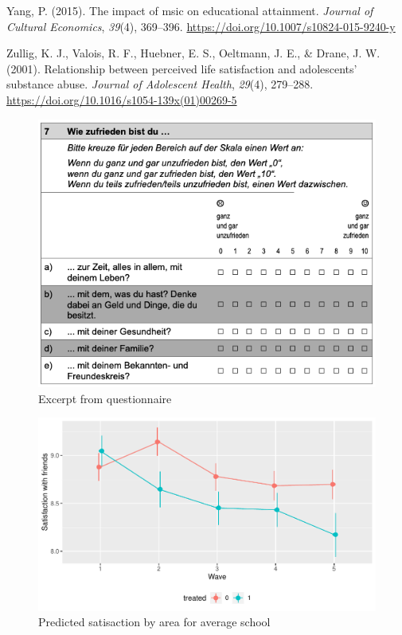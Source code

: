 \documentclass[a4, 12pt]{article}
\begin{document}
\leavevmode\hypertarget{ref-Yang2015}{}%
Yang, P. (2015). The impact of msic on educational attainment. \emph{Journal of Cultural Economics}, \emph{39}(4), 369--396. \url{https://doi.org/10.1007/s10824-015-9240-y}

\leavevmode\hypertarget{ref-Zullig2001}{}%
Zullig, K. J., Valois, R. F., Huebner, E. S., Oeltmann, J. E., \& Drane, J. W. (2001). Relationship between perceived life satisfaction and adolescents' substance abuse. \emph{Journal of Adolescent Health}, \emph{29}(4), 279--288. \url{https://doi.org/10.1016/s1054-139x(01)00269-5}

\clearpage

\hypertarget{appendix-appendix}{%
\appendix}


\begin{figure}[H]

{\centering \includegraphics[width=0.8\linewidth,]{../figures/questionnaire_satisfaction} 

}

\caption{Excerpt from questionnaire}\label{fig:questionnaire}
\end{figure}
\begin{figure}[H]

{\centering \includegraphics[width=0.8\linewidth,]{../figures/sat_friends_pred} 

}

\caption{Predicted satisaction by area for average school}\label{fig:sat-friends-pred}
\end{figure}
\end{document}

